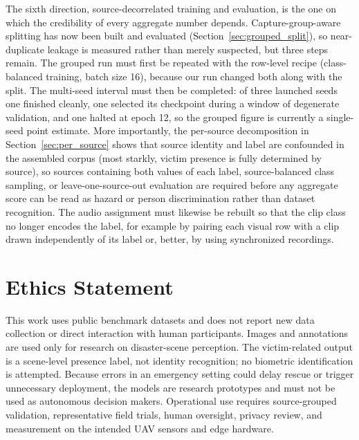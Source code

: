 \documentclass[journal]{IEEEtran}
\begin{document}
The sixth direction, source-decorrelated training and evaluation, is the one on which the credibility of every aggregate number depends. Capture-group-aware splitting has now been built and evaluated (Section~\ref{sec:grouped_split}), so near-duplicate leakage is measured rather than merely suspected, but three steps remain. The grouped run must first be repeated with the row-level recipe (class-balanced training, batch size 16), because our run changed both along with the split. The multi-seed interval must then be completed: of three launched seeds one finished cleanly, one selected its checkpoint during a window of degenerate validation, and one halted at epoch 12, so the grouped figure is currently a single-seed point estimate. More importantly, the per-source decomposition in Section~\ref{sec:per_source} shows that source identity and label are confounded in the assembled corpus (most starkly, victim presence is fully determined by source), so sources containing both values of each label, source-balanced class sampling, or leave-one-source-out evaluation are required before any aggregate score can be read as hazard or person discrimination rather than dataset recognition. The audio assignment must likewise be rebuilt so that the clip class no longer encodes the label, for example by pairing each visual row with a clip drawn independently of its label or, better, by using synchronized recordings.


\section*{Ethics Statement}

This work uses public benchmark datasets and does not report new data collection or direct interaction with human participants. Images and annotations are used only for research on disaster-scene perception. The victim-related output is a scene-level presence label, not identity recognition; no biometric identification is attempted. Because errors in an emergency setting could delay rescue or trigger unnecessary deployment, the models are research prototypes and must not be used as autonomous decision makers. Operational use requires source-grouped validation, representative field trials, human oversight, privacy review, and measurement on the intended UAV sensors and edge hardware.


\ifCLASSOPTIONcaptionsoff
  \newpage
\fi



\end{document}
